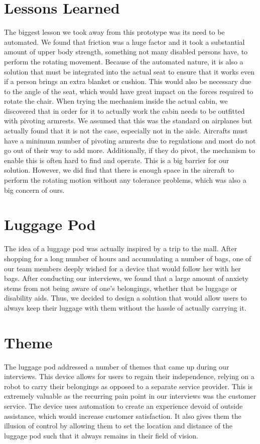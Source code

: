 \section*{Lessons Learned}
The biggest lesson we took away from this prototype was its need to be automated. We found that friction was a huge factor and it took a substantial amount of upper body strength, something not many disabled persons have, to perform the rotating movement. Because of the automated nature, it is also a solution that must be integrated into the actual seat to ensure that it works even if a person brings an extra blanket or cushion. This would also be necessary due to the angle of the seat, which would have great impact on the forces required to rotate the chair. When trying the mechanism inside the actual cabin, we discovered that in order for it to actually work the cabin needs to be outfitted with pivoting armrests. We assumed that this was the standard on airplanes but actually found that it is not the case, especially not in the aisle. Aircrafts must have a minimum number of pivoting armrests due to regulations and most do not go out of their way to add more. Additionally, if they do pivot, the mechanism to enable this is often hard to find and operate. This is a big barrier for our solution. However, we did find that there is enough space in the aircraft to perform the rotating motion without any tolerance problems, which was also a big concern of ours. 

\section{Luggage Pod}
The idea of a luggage pod was actually inspired by a trip to the mall. After shopping for a long number of hours and accumulating a number of bags, one of our team members deeply wished for a device that would follow her with her bags. After conducting our interviews, we found that a large amount of anxiety stems from not being aware of one’s belongings, whether that be luggage or disability aids. Thus, we decided to design a solution that would allow users to always keep their luggage with them without the hassle of actually carrying it.

\section*{Theme}
The luggage pod addressed a number of themes that came up during our interviews. This device allows for users to regain their independence, relying on a robot to carry their belongings as opposed to a separate service provider. This is extremely valuable as the recurring pain point in our interviews was the customer service. The device uses automation to create an experience devoid of outside assistance, which would increase customer satisfaction. It also gives them the illusion of control by allowing them to set the location and distance of the luggage pod such that it always remains in their field of vision. 

